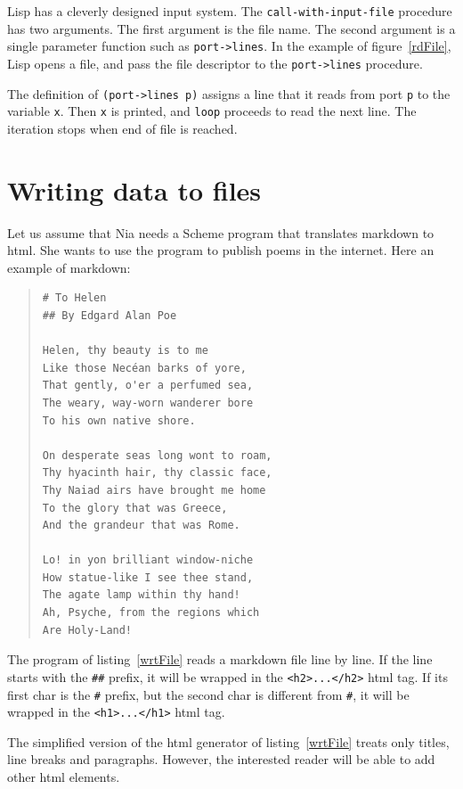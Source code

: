 \documentclass[a4paper,12pt]{book}
\begin{document}
Lisp has a cleverly designed input system.
The  
\verb|call-with-input-file| \label{page:call-with-input-file}
procedure has two arguments. The first
argument is the file name. 
The second argument is
a single parameter function such
as \verb|port->lines|. In the example
of figure~\ref{rdFile}, Lisp 
opens a file, and pass the file descriptor
to the \verb|port->lines| procedure.

The definition of \verb|(port->lines p)| assigns
a line that it reads  from port \verb|p| to the
variable \verb|x|. Then \verb|x| is printed, and
\verb|loop| proceeds to read the next line. The
iteration stops when  end of file is reached.


\section{Writing data to files}
Let us assume that Nia needs 
a Scheme program that translates
markdown to html. She wants to
use the program to publish poems
in the internet. Here an example
of markdown:
\begin{quote}
\begin{verbatim}
# To Helen
## By Edgard Alan Poe

Helen, thy beauty is to me
Like those Necéan barks of yore,
That gently, o'er a perfumed sea,
The weary, way-worn wanderer bore
To his own native shore.

On desperate seas long wont to roam,
Thy hyacinth hair, thy classic face,
Thy Naiad airs have brought me home
To the glory that was Greece,
And the grandeur that was Rome.

Lo! in yon brilliant window-niche 
How statue-like I see thee stand, 
The agate lamp within thy hand! 
Ah, Psyche, from the regions which 
Are Holy-Land! 
\end{verbatim}
\end{quote}

The program of listing~\ref{wrtFile}
reads a markdown file line by line.
If the line starts with the \verb|##| prefix,
it will be wrapped in the \verb|<h2>...</h2>|
html tag. If its first char is the \verb|#|
prefix, but the second char is different
from \verb|#|, it will be wrapped in
the \verb|<h1>...</h1>| html tag.

The simplified version of the html
generator of listing~\ref{wrtFile} treats
only titles, line breaks and paragraphs.
However, the interested reader will
be able to add other html elements.
\end{document}

